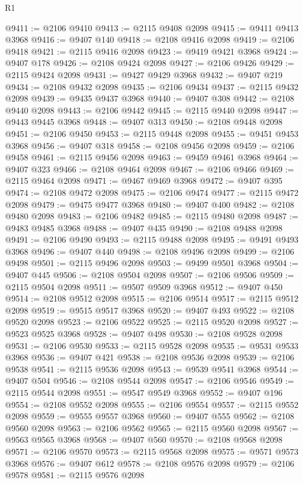 \begin{lexlean}{R1}
\begin{coremodule}
@9411 := @2106 @9410
@9413 := @2115 @9408 @2098
@9415 := @9411 @9413 @3968
@9416 := @9407 @140
@9418 := @2108 @9416 @2098
@9419 := @2106 @9418
@9421 := @2115 @9416 @2098
@9423 := @9419 @9421 @3968
@9424 := @9407 @178
@9426 := @2108 @9424 @2098
@9427 := @2106 @9426
@9429 := @2115 @9424 @2098
@9431 := @9427 @9429 @3968
@9432 := @9407 @219
@9434 := @2108 @9432 @2098
@9435 := @2106 @9434
@9437 := @2115 @9432 @2098
@9439 := @9435 @9437 @3968
@9440 := @9407 @308
@9442 := @2108 @9440 @2098
@9443 := @2106 @9442
@9445 := @2115 @9440 @2098
@9447 := @9443 @9445 @3968
@9448 := @9407 @313
@9450 := @2108 @9448 @2098
@9451 := @2106 @9450
@9453 := @2115 @9448 @2098
@9455 := @9451 @9453 @3968
@9456 := @9407 @318
@9458 := @2108 @9456 @2098
@9459 := @2106 @9458
@9461 := @2115 @9456 @2098
@9463 := @9459 @9461 @3968
@9464 := @9407 @323
@9466 := @2108 @9464 @2098
@9467 := @2106 @9466
@9469 := @2115 @9464 @2098
@9471 := @9467 @9469 @3968
@9472 := @9407 @395
@9474 := @2108 @9472 @2098
@9475 := @2106 @9474
@9477 := @2115 @9472 @2098
@9479 := @9475 @9477 @3968
@9480 := @9407 @400
@9482 := @2108 @9480 @2098
@9483 := @2106 @9482
@9485 := @2115 @9480 @2098
@9487 := @9483 @9485 @3968
@9488 := @9407 @435
@9490 := @2108 @9488 @2098
@9491 := @2106 @9490
@9493 := @2115 @9488 @2098
@9495 := @9491 @9493 @3968
@9496 := @9407 @440
@9498 := @2108 @9496 @2098
@9499 := @2106 @9498
@9501 := @2115 @9496 @2098
@9503 := @9499 @9501 @3968
@9504 := @9407 @445
@9506 := @2108 @9504 @2098
@9507 := @2106 @9506
@9509 := @2115 @9504 @2098
@9511 := @9507 @9509 @3968
@9512 := @9407 @450
@9514 := @2108 @9512 @2098
@9515 := @2106 @9514
@9517 := @2115 @9512 @2098
@9519 := @9515 @9517 @3968
@9520 := @9407 @493
@9522 := @2108 @9520 @2098
@9523 := @2106 @9522
@9525 := @2115 @9520 @2098
@9527 := @9523 @9525 @3968
@9528 := @9407 @498
@9530 := @2108 @9528 @2098
@9531 := @2106 @9530
@9533 := @2115 @9528 @2098
@9535 := @9531 @9533 @3968
@9536 := @9407 @421
@9538 := @2108 @9536 @2098
@9539 := @2106 @9538
@9541 := @2115 @9536 @2098
@9543 := @9539 @9541 @3968
@9544 := @9407 @504
@9546 := @2108 @9544 @2098
@9547 := @2106 @9546
@9549 := @2115 @9544 @2098
@9551 := @9547 @9549 @3968
@9552 := @9407 @196
@9554 := @2108 @9552 @2098
@9555 := @2106 @9554
@9557 := @2115 @9552 @2098
@9559 := @9555 @9557 @3968
@9560 := @9407 @555
@9562 := @2108 @9560 @2098
@9563 := @2106 @9562
@9565 := @2115 @9560 @2098
@9567 := @9563 @9565 @3968
@9568 := @9407 @560
@9570 := @2108 @9568 @2098
@9571 := @2106 @9570
@9573 := @2115 @9568 @2098
@9575 := @9571 @9573 @3968
@9576 := @9407 @612
@9578 := @2108 @9576 @2098
@9579 := @2106 @9578
@9581 := @2115 @9576 @2098

\end{coremodule}
\end{lexlean}
